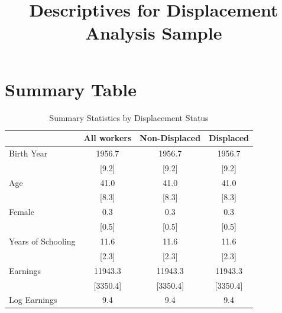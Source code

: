 \documentclass{article}
\begin{document}
\title{Descriptives for Displacement Analysis Sample}
\maketitle
\section{Summary Table}
\begin{table}[htbp] 
\centering 
\begin{threeparttable} 
\caption{Summary Statistics by Displacement Status} 

\centering
\begin{tabular}{llll}
\toprule
\multicolumn{1}{c}{} &
  \multicolumn{1}{r}{All workers} &
  \multicolumn{1}{r}{Non-Displaced} &
  \multicolumn{1}{r}{Displaced} \\
\midrule
\multicolumn{1}{l}{Birth Year} &
  \multicolumn{1}{c}{1956.7} &
  \multicolumn{1}{c}{1956.7} &
  \multicolumn{1}{c}{1956.7} \\
\multicolumn{1}{l}{} &
  \multicolumn{1}{c}{[9.2]} &
  \multicolumn{1}{c}{[9.2]} &
  \multicolumn{1}{c}{[9.2]} \\
\multicolumn{1}{l}{Age} &
  \multicolumn{1}{c}{41.0} &
  \multicolumn{1}{c}{41.0} &
  \multicolumn{1}{c}{41.0} \\
\multicolumn{1}{l}{} &
  \multicolumn{1}{c}{[8.3]} &
  \multicolumn{1}{c}{[8.3]} &
  \multicolumn{1}{c}{[8.3]} \\
\multicolumn{1}{l}{Female} &
  \multicolumn{1}{c}{0.3} &
  \multicolumn{1}{c}{0.3} &
  \multicolumn{1}{c}{0.3} \\
\multicolumn{1}{l}{} &
  \multicolumn{1}{c}{[0.5]} &
  \multicolumn{1}{c}{[0.5]} &
  \multicolumn{1}{c}{[0.5]} \\
\multicolumn{1}{l}{Years of Schooling} &
  \multicolumn{1}{c}{11.6} &
  \multicolumn{1}{c}{11.6} &
  \multicolumn{1}{c}{11.6} \\
\multicolumn{1}{l}{} &
  \multicolumn{1}{c}{[2.3]} &
  \multicolumn{1}{c}{[2.3]} &
  \multicolumn{1}{c}{[2.3]} \\
\multicolumn{1}{l}{Earnings} &
  \multicolumn{1}{c}{11943.3} &
  \multicolumn{1}{c}{11943.3} &
  \multicolumn{1}{c}{11943.3} \\
\multicolumn{1}{l}{} &
  \multicolumn{1}{c}{[3350.4]} &
  \multicolumn{1}{c}{[3350.4]} &
  \multicolumn{1}{c}{[3350.4]} \\
\multicolumn{1}{l}{Log Earnings} &
  \multicolumn{1}{c}{9.4} &
  \multicolumn{1}{c}{9.4} &
  \multicolumn{1}{c}{9.4} \\

\end{tabular}
\end{threeparttable}
\end{table}
\end{document}
